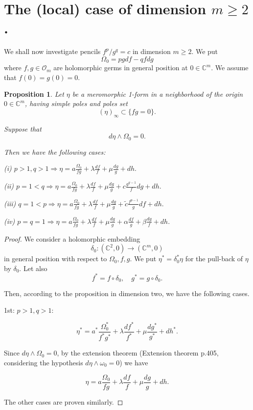 \documentclass[11pt,a4paper]{amsart}
\newtheorem{proposition}[theorem]{Proposition}
\theoremstyle{definition}
\begin{document}


\section{The (local) case of dimension \(m \ge 2\).}

We shall now investigate pencils \(f^p/g^q = c\) in dimension \(m \ge 2\).
We put
\[
\Omega_0 = p g df - q f dg
\]
where \(f,g \in \mathcal O_m\) are holomorphic germs in general position at \(0 \in \mathbb C^m\).
We assume that \(f(0)=g(0)=0\).

\begin{proposition}
\label{proposition:cohomologyeqdimm}
Let \(\eta\) be a meromorphic 1-form in a neighborhood of the origin
\(0 \in \mathbb C^m\), having simple poles and poles set
\[
(\eta)_\infty \subset \{ f g = 0 \}.
\]

Suppose that
\[
d\eta \wedge \Omega_0 = 0.
\]

Then we have the following cases:

(i) \(p>1, q>1 \Rightarrow
\eta = a \frac{\Omega_0}{fg}
+ \lambda \frac{df}{f}
+ \mu \frac{dg}{g}
+ dh.
\)

(ii) \(p=1<q \Rightarrow
\eta = a \frac{\Omega_0}{fg}
+ \lambda \frac{df}{f}
+ \mu \frac{dg}{g}
+ c \frac{g^{q-1}}{f} dg
+ dh.
\)

(iii) \(q=1<p \Rightarrow
\eta = a \frac{\Omega_0}{fg}
+ \lambda \frac{df}{f}
+ \mu \frac{dg}{g}
+ \tilde c \frac{f^{p-1}}{g} df
+ dh.
\)

(iv) \(p=q=1 \Rightarrow
\eta = a \frac{\Omega_0}{fg}
+ \lambda \frac{df}{f}
+ \mu \frac{dg}{g}
+ \alpha \frac{df}{g}
+ \beta \frac{dg}{f}
+ dh.
\)
\end{proposition}
\begin{proof}

We consider a holomorphic embedding
\[
\delta_0 : (\mathbb C^2,0) \to (\mathbb C^m,0)
\]
in general position with respect to \(\Omega_0, f, g\).
We put \(\eta^* = \delta_0^* \eta\) for the pull-back of \(\eta\) by \(\delta_0\).
Let also
\[
f^* = f \circ \delta_0,
\quad
g^* = g \circ \delta_0.
\]

Then, according to the proposition in dimension two, we have the following cases.

1st: \(p>1, q>1\):

\[
\eta^* = a^* \frac{\Omega_0^*}{f^* g^*}
+ \lambda \frac{df^*}{f^*}
+ \mu \frac{dg^*}{g^*}
+ dh^*.
\]

Since \(d\eta \wedge \Omega_0 = 0\), by the extension theorem
\cite{[Cerveau--Berthier]}(Extension theorem p.405, considering the hypothesis $d \eta \wedge \omega_0=0$) we have

\[
\eta = a \frac{\Omega_0}{fg}
+ \lambda \frac{df}{f}
+ \mu \frac{dg}{g}
+ dh.
\]

The other cases are proven similarly.
\end{proof}
\end{document}
